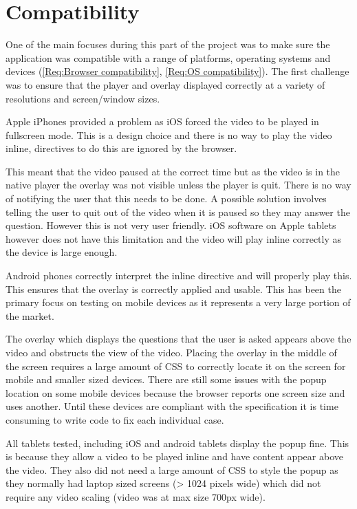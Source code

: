 \section{Compatibility}
\label{Section:Compatibility}

One of the main focuses during this part of the project was to make sure the application was compatible with a range of platforms, operating systems and devices (\cref{Req:Browser compatibility}, \cref{Req:OS compatibility}). The first challenge was to ensure that the player and overlay displayed correctly at a variety of resolutions and screen/window sizes.

Apple iPhones provided a problem as iOS forced the video to be played in fullscreen mode. This is a design choice and there is no way to play the video inline, directives to do this are ignored by the browser.

This meant that the video paused at the correct time but as the video is in the native player the overlay was not visible unless the player is quit. There is no way of notifying the user that this needs to be done. A possible solution involves telling the user to quit out of the video when it is paused so they may answer the question. However this is not very user friendly. iOS software on Apple tablets however does not have this limitation and the video will play inline correctly as the device is large enough.

Android phones correctly interpret the inline directive and will properly play this. This ensures that the overlay is correctly applied and usable. This has been the primary focus on testing on mobile devices as it represents a very large portion of the market.

The overlay which displays the questions that the user is asked appears above the video and obstructs the view of the video. Placing the overlay in the middle of the screen requires a large amount of \gls{CSS} to correctly locate it on the screen for mobile and smaller sized devices. There are still some issues with the popup location on some mobile devices because the browser reports one screen size and uses another. Until these devices are compliant with the specification it is time consuming to write code to fix each individual case.

All tablets tested, including iOS and android tablets display the popup fine. This is because they allow a video to be played inline and have content appear above the video. They also did not need a large amount of \gls{CSS} to style the popup as they normally had laptop sized screens (> 1024 pixels wide) which did not require any video scaling (video was at max size 700px wide).

